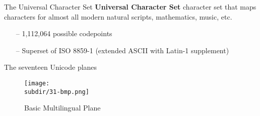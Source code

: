\documentclass[../index.tex]{subfiles}
\begin{document}
\renewcommand{\currenttitle}{The Universal Character Set}
\begin{frame}{\currenttitle}
%
%
%
%
  \textbf{Universal Character Set} \textendash{} 
      character set that maps characters for almost all modern natural scripts, 
      mathematics, music, etc. \\

  \begin{itemize}
    \item[--] 1,112,064 possible codepoints
    \item[--] Superset of ISO 8859-1 (extended ASCII with Latin-1 supplement)
  \end{itemize}
\end{frame}

\renewcommand{\currenttitle}{The seventeen Unicode planes}
\begin{frame}{\currenttitle}
%
%
%
  \vspace*{1em}
  \begin{figure}
    \centering
    \texttt{[image: \\subdir/31-bmp.png]}
    \caption{Basic Multilingual Plane}
  \end{figure}
\end{frame}
\end{document}
